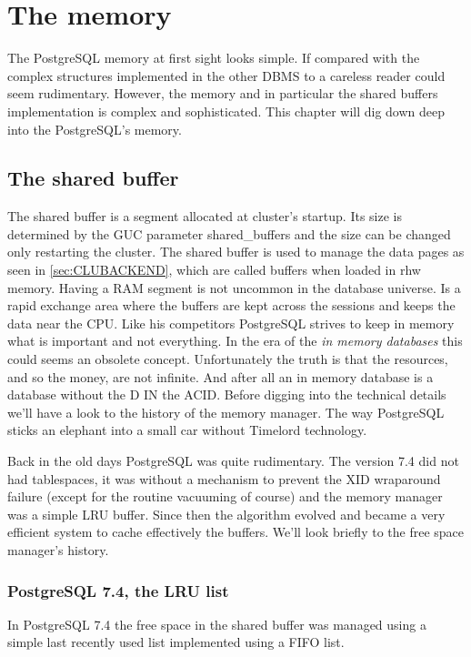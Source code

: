 \chapter{The memory}
\label{ch:PGMEMORY}
The PostgreSQL memory at first sight looks simple. If compared with the complex structures implemented in 
the other DBMS to a careless reader could seem rudimentary. However, the memory and in particular the 
shared buffers implementation is complex and sophisticated. This chapter will dig down deep into the 
PostgreSQL's memory.

\section{The shared buffer}
The shared buffer is a segment allocated at cluster's startup. Its size is determined by the GUC parameter 
shared\_buffers and the size can be changed only restarting the cluster. The shared buffer is used 
to manage the data pages as seen in \ref{sec:CLUBACKEND}, which are called buffers when loaded in 
rhw memory. Having a RAM segment is not uncommon in the database universe. Is a rapid exchange 
area where the buffers are kept across the sessions and keeps the data near the CPU. Like his competitors 
PostgreSQL strives to keep in memory what is important and not everything. In the era of the 
\textit{in memory databases} this could seems an obsolete concept. Unfortunately the truth is that the 
resources, and so the money, are not infinite. And after all an in memory database is a database without the D IN 
the ACID. Before digging into the technical details we'll have a look 
to the history of the memory manager. The way PostgreSQL sticks an elephant into a small car without 
Timelord technology.

Back in the old days PostgreSQL was quite rudimentary. The version 7.4 did not had tablespaces, it was 
without a mechanism to prevent the XID wraparound failure (except for the routine vacuuming of course) 
and the memory manager was a simple LRU buffer. Since then the algorithm evolved and became a very efficient system to 
cache effectively the buffers. We'll look briefly to the free space manager's history. 

\subsection{PostgreSQL 7.4, the LRU list}
In PostgreSQL 7.4 the free space in the shared buffer was managed using a simple last recently used list implemented using a FIFO list.

